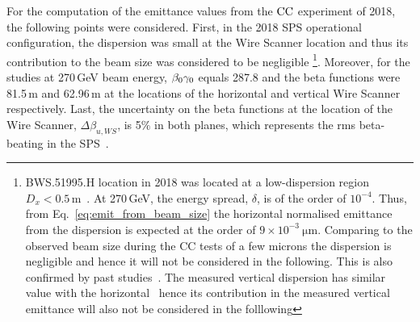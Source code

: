 For the computation of the emittance values from the ${\mathrm{CC}}$ experiment of 2018, the following points were considered. First, in the 2018 SPS operational configuration, the dispersion was small at the Wire Scanner location and thus its contribution to the beam size was considered to be negligible \footnote{BWS.51995.H location in 2018 was located at a low-dispersion region $D_x < 0.5$\,m~\cite{Roncarolo:1481835}. At 270\,GeV, the energy spread, $\delta$, is of the order of $\mathrm{10^{-4}}$. Thus, from Eq.~\eqref{eq:emit_from_beam_size} the horizontal normalised emittance from the dispersion is expected at the order of $\mathrm{9\times 10^{-3} \ \mu m}$. Comparing to the observed beam size during the CC tests of a few microns the dispersion is negligible and hence it will not be considered in the following. This is also confirmed by past studies~\cite{Roncarolo:1481835}. The measured vertical dispersion has similar value with the horizontal~\cite{Hannes_personal_communication} hence its contribution in the measured vertical emittance will also not be considered in the folllowing}. Moreover, for the studies at 270\,GeV beam energy, ${\beta_0} {\gamma_0}$ equals 287.8 and the beta functions were 81.5\,m and 62.96\,m at the locations of the horizontal and vertical Wire Scanner respectively. Last, the uncertainty on the beta functions at the location of the Wire Scanner, $\Delta \beta_{u, WS}$, is 5$\%$ in both planes, which represents the rms beta-beating in the SPS~\cite{SPS-beta-beating-Rogelio}.





